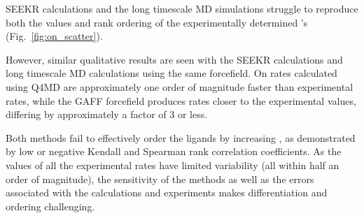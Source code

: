 





\par SEEKR calculations and the long timescale MD simulations struggle to 
reproduce both the values and rank ordering of the experimentally determined \kon's (Fig.~\ref{fig:on_scatter}).

However, similar qualitative results are seen with the SEEKR calculations and 
long timescale MD calculations using the same forcefield.
On rates calculated using Q4MD are approximately one order of magnitude faster 
than experimental rates, while the GAFF forcefield produces rates closer to the 
experimental values, differing by approximately a factor of 3 or less.

\par Both methods fail to effectively order the ligands by increasing \kon, 
as demonstrated by low or negative Kendall and Spearman rank correlation coefficients.
As the values of all the experimental rates have limited variability (all within 
half an order of magnitude), the sensitivity of the methods as well as the errors 
associated with the calculations and experiments makes differentiation and 
ordering challenging. 

